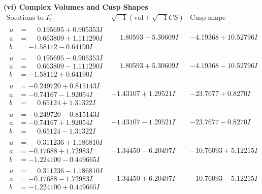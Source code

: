 \documentclass[1p]{elsarticle_modified}
\theoremstyle{definition}
\newcommand{\I}{\sqrt{-1}}
\begin{document}
\newpage\flushleft \textbf{(vi) Complex Volumes and Cusp Shapes}
$$\begin{array}{c|c|c}  
\text{Solutions to }I^u_{2}& \I (\text{vol} + \sqrt{-1}CS) & \text{Cusp shape}\\
 \hline 
\begin{aligned}
u &= \phantom{-}0.195695 + 0.905353 I \\
a &= \phantom{-}0.663809 + 1.111290 I \\
b &= -1.58112 - 0.64190 I\end{aligned}
 & \phantom{-}1.80593 - 5.30609 I & -4.19368 + 10.52796 I \\ \hline\begin{aligned}
u &= \phantom{-}0.195695 - 0.905353 I \\
a &= \phantom{-}0.663809 - 1.111290 I \\
b &= -1.58112 + 0.64190 I\end{aligned}
 & \phantom{-}1.80593 + 5.30609 I & -4.19368 - 10.52796 I \\ \hline\begin{aligned}
u &= -0.249720 + 0.815143 I \\
a &= -0.74167 - 1.92054 I \\
b &= \phantom{-}0.65124 + 1.31322 I\end{aligned}
 & -1.43107 + 1.29521 I & -23.7677 + 0.8270 I \\ \hline\begin{aligned}
u &= -0.249720 - 0.815143 I \\
a &= -0.74167 + 1.92054 I \\
b &= \phantom{-}0.65124 - 1.31322 I\end{aligned}
 & -1.43107 - 1.29521 I & -23.7677 - 0.8270 I \\ \hline\begin{aligned}
u &= \phantom{-}0.311236 + 1.186810 I \\
a &= -0.17688 + 1.72983 I \\
b &= -1.224100 - 0.449665 I\end{aligned}
 & -1.34450 - 6.20497 I & -10.76093 + 5.12215 I \\ \hline\begin{aligned}
u &= \phantom{-}0.311236 - 1.186810 I \\
a &= -0.17688 - 1.72983 I \\
b &= -1.224100 + 0.449665 I\end{aligned}
 & -1.34450 + 6.20497 I & -10.76093 - 5.12215 I \\ \hline\begin{aligned}

\end{aligned}
\end{array}$$
\end{document}
